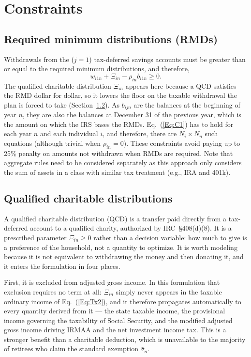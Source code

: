 \documentclass[fleqn,12pt]{report}
\begin{document}
\section{Constraints}
\subsection{Required minimum distributions (RMDs)}
	Withdrawals from the ($j=1$) tax-deferred savings accounts must be greater
	than or equal to the required minimum distributions, and therefore,
	\begin{equation}
		\label{Eq:C1}
		w_{i1n} + \Xi_{in} -  \rho_{in}b_{i1n} \geq 0.
	\end{equation}
	The qualified charitable distribution $\Xi_{in}$ appears here because a QCD
	satisfies the RMD dollar for dollar, so it lowers the floor on the taxable
	withdrawal the plan is forced to take (Section~\ref{sec:qcd}).
	As $b_{ijn}$ are the balances at the beginning of year $n$, they are also the balances
	at December 31 of the previous year, which is the amount on which the IRS bases the RMDs.
	Eq.~(\ref{Eq:C1}) has to hold for each year $n$ and each individual $i$, and therefore, there
	are $N_i\times N_n$ such equations (although trivial when $\rho_{in} = 0$).
	These constraints avoid paying up to 25\% penalty
	on amounts not withdrawn when RMDs are required.
	Note that aggregate rules need to be considered separately as this approach only considers
	the sum of assets in a class with similar tax treatment (e.g., IRA and 401k).

\subsection{Qualified charitable distributions}
\label{sec:qcd}
	A qualified charitable distribution (QCD) is a transfer paid directly from a
	tax-deferred account to a qualified charity, authorized by IRC~\S408(d)(8).
	It is a prescribed parameter $\Xi_{in} \ge 0$ rather than a decision variable:
	how much to give is a preference of the household, not a quantity to optimize.
	It is worth modeling because it is not equivalent to withdrawing the money and
	then donating it, and it enters the formulation in four places.

	First, it is excluded from adjusted gross income. In this formulation that
	exclusion requires no term at all: $\Xi_{in}$ simply never appears in the
	taxable ordinary income of Eq.~(\ref{Eq:Tx2}), and it therefore propagates
	automatically to every quantity derived from it --- the state taxable income,
	the provisional income governing the taxability of Social Security, and the
	modified adjusted gross income driving IRMAA and the net investment income tax.
	This is a stronger benefit than a charitable deduction, which is unavailable to
	the majority of retirees who claim the standard exemption $\bar{\sigma}_n$.
\end{document}
